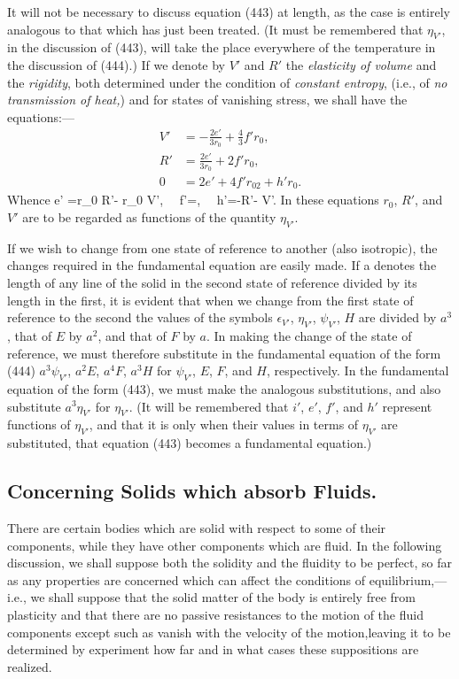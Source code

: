 \documentclass[12pt]{article}
\begin{document}
{It will not be necessary to discuss equation (443) at length, as the case is entirely analogous to that which has just been treated. (It must be remembered that $\eta_{V'}$, in the discussion of (443), will take the place everywhere of the temperature in the discussion of (444).) If we denote by $V'$ and $R'$ the \textit{elasticity of volume} and the \textit{rigidity}, both determined under the condition of \textit{constant entropy}, (i.e., of \textit{no transmission of heat,}) and for states of vanishing stress, we shall have the equations:---
\begin{align} V' &= -\frac{2e'}{3r_0}+\frac{4}{3}f'r_0 ,\label{458} \\
 R' &= \frac{2e'}{3r_0} +2f'r_0,   \label{459} \\
 0 &= 2e' + 4f'r_02 + h'r_0. \label{460}\end{align}
Whence
\eqs e' =r_0 R'- r_0 V', \ \ f'=, \ \ h'=-R'- V'. \label{461}\eqe
In these equations $r_0$, $R'$, and $V'$ are to be regarded as functions of the quantity $\eta_{V'}$.


If we wish to change from one state of reference to another (also isotropic), the changes required in the fundamental equation are easily made. If a denotes the length of any line of the solid in the second state of reference divided by its length in the first, it is evident that when we change from the first state of reference to the second the values of the symbols $\epsilon_{V'}$, $\eta_{V'}$, $\psi_{V'}$, $H$ are divided by $a^3$, that of $E$ by $a^2$, and that of $F$ by $a$. In making the change of the state of reference, we must therefore substitute in the fundamental equation of the form  (444) $a^3 \psi_{V'}$, $a^2E$, $a^4F$, $a^3H$ for $\psi_{V'}$, $E$, $F$, and $H$, respectively. In the fundamental equation of the form (443), we must make the analogous substitutions, and also substitute $a^3\eta_{V'}$ for $\eta_{V'}$. (It will be remembered that $i'$, $e'$, $f'$, and $h'$ represent functions of $\eta_{V'}$, and that it is only when their values in terms of $\eta_{V'}$ are substituted, that equation (443) becomes a fundamental equation.)

\subsection{Concerning Solids which absorb Fluids.}
There are certain bodies which are solid with respect to some of their components, while they have other components which are fluid. In the following discussion, we shall suppose both the solidity and the fluidity to be perfect, so far as any properties are concerned which can affect the conditions of equilibrium,---i.e., we shall suppose that the solid matter of the body is entirely free from plasticity and that there are no passive resistances to the motion of the fluid components except such as vanish with the velocity of the motion,leaving it to be determined by experiment how far and in what cases these suppositions are realized.


}
\end{document}
